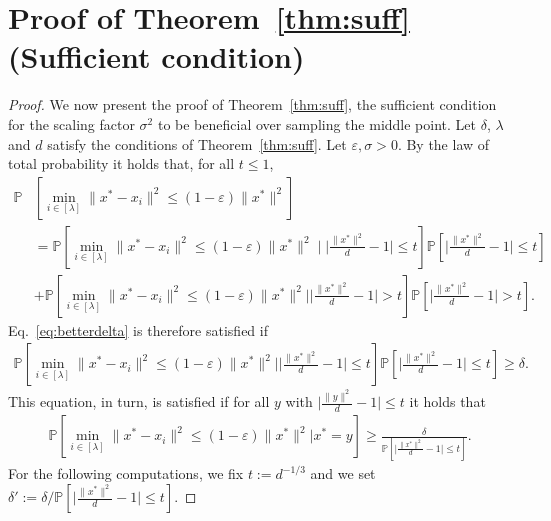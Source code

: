 \section{Proof of Theorem~\ref{thm:suff} (Sufficient condition)}
\label{sec:suff}
\begin{proof}

We now present the proof of Theorem~\ref{thm:suff}, the sufficient condition for the scaling factor $\sigma^2$ to be beneficial over sampling the middle point. 
Let $\delta$, $\lambda$ and $d$ satisfy the conditions of Theorem~\ref{thm:suff}. 
Let $\varepsilon,\sigma>0$. By the law of total probability it holds that, for all $t\leq 1$,  
\begin{align*}
  \mathbb{P}&\left[\min_{i\in[\lambda]}\lVert x^*-x_i\rVert^2 \leq \left(1-\varepsilon\right)\lVert x^*\rVert^2\right] \\ &=\mathbb{P}\left[\min_{i\in[\lambda]}\lVert x^*-x_i\rVert^2 \leq \left(1-\varepsilon\right)\lVert x^*\rVert^2 \mid \lvert\frac{\lVert x^*\rVert^2}{d}-1\rvert\leq t\right]
  \mathbb{P}\left[\lvert\frac{\lVert x^*\rVert^2}{d}-1\rvert\leq t\right]\\
  &+\mathbb{P}\left[\min_{i\in[\lambda]}\lVert x^*-x_i\rVert^2 \leq \left(1-\varepsilon\right)\lVert x^*\rVert^2\big| \lvert\frac{\lVert x^*\rVert^2}{d}-1\rvert> t\right]
  \mathbb{P}\left[\lvert\frac{\lVert x^*\rVert^2}{d}-1\rvert> t\right].
\end{align*}
Eq.~\ref{eq:betterdelta} is therefore satisfied if 
\begin{eqnarray*}
\mathbb{P}\left[\min_{i\in[\lambda]}\lVert x^*-x_i\rVert^2 \leq \left(1-\varepsilon\right)\lVert x^*\rVert^2\big| \lvert\frac{\lVert x^*\rVert^2}{d}-1\rvert\leq t\right]
  \mathbb{P}\left[\lvert\frac{\lVert x^*\rVert^2}{d}-1\rvert\leq t\right]\geq \delta.
\end{eqnarray*}
This equation, in turn, is satisfied if for all $y$ with $\lvert\frac{\rVert y\rVert^2}{d}-1\rvert\leq t$ it holds that
\begin{eqnarray}
\mathbb{P}\left[\min_{i\in[\lambda]}\lVert x^*-x_i\rVert^2 \leq \left(1-\varepsilon\right)\lVert x^*\rVert^2\big|x^*=y\right]
\geq \frac{\delta}{\mathbb{P}\left[\lvert\frac{\lVert x^*\rVert^2}{d}-1\rvert\leq t\right]}.
\label{eq:suff2}
\end{eqnarray}
For the following computations, we fix $t:=d^{-1/3}$ and we set $\delta':=\delta/\mathbb{P}\left[\lvert\frac{\lVert x^*\rVert^2}{d}-1\rvert\leq t\right]$.


\end{proof}

